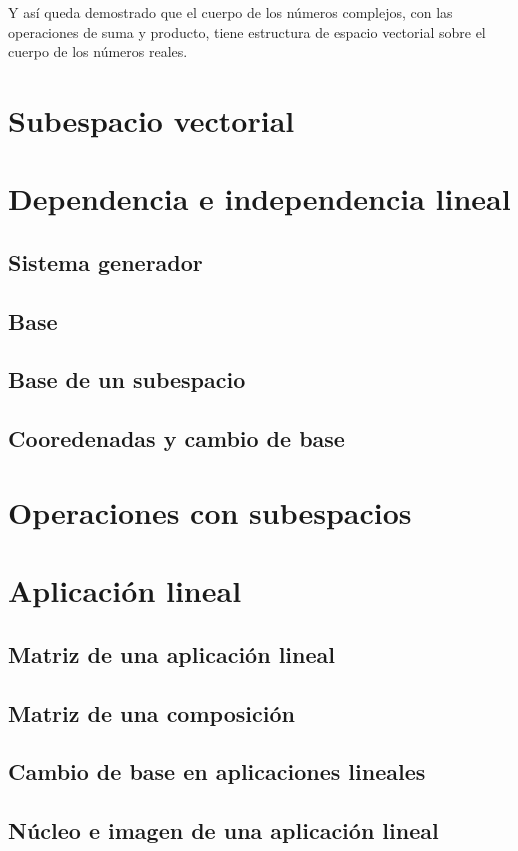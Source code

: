 \documentclass[0_algebra.tex]{subfiles}
\begin{document}
Y así queda demostrado que el cuerpo de los números complejos, con las operaciones de suma y producto, tiene estructura de espacio vectorial sobre el cuerpo de los números reales.
\section{Subespacio vectorial}

\section{Dependencia e independencia lineal}
\subsection{Sistema generador}
\subsection{Base}
\subsection{Base de un subespacio}
\subsection{Cooredenadas y cambio de base}

\section{Operaciones con subespacios}

\section{Aplicación lineal}
\subsection{Matriz de una aplicación lineal}
\subsection{Matriz de una composición}
\subsection{Cambio de base en aplicaciones lineales}
\subsection{Núcleo e imagen de una aplicación lineal}
\end{document}
